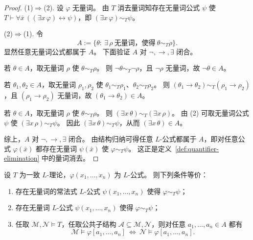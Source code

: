 \documentclass[lang=cn,a4paper,newtx,section]{elegantbook}
\begin{document}
\begin{proof}
(1)$\Rightarrow$(2).
设 $\varphi$ 无量词。
由 $T$ 消去量词知存在无量词公式 $\psi$ 使 $T\vdash\forall\bar x\,((\exists x\,\varphi)\leftrightarrow\psi)$，即 $(\exists x\,\varphi)\sim_T\psi$。

(2)$\Rightarrow$(1).
令
\[
  A:=\{\theta:\ \exists\,\rho\ \text{无量词，使得}\ \theta\sim_T\rho\}.
\]
显然任意无量词公式都属于 $A$。
下面验证 $A$ 对 $\neg,\to,\exists$ 闭合。

若 $\theta\in A$，取无量词 $\rho$ 使 $\theta\sim_T\rho$。
则 $\neg\theta\sim_T\neg\rho$，且 $\neg\rho$ 无量词，故 $\neg\theta\in A$。

若 $\theta_1,\theta_2\in A$，取无量词 $\rho_1,\rho_2$ 使 $\theta_1\sim_T\rho_1$、$\theta_2\sim_T\rho_2$。
则 $(\theta_1\to\theta_2)\sim_T(\rho_1\to\rho_2)$，且 $(\rho_1\to\rho_2)$ 无量词，故 $(\theta_1\to\theta_2)\in A$。

 若 $\theta\in A$，取无量词 $\rho$ 使 $\theta\sim_T\rho$。
 则 $(\exists x\,\theta)\sim_T(\exists x\,\rho)$。
 由 (2) 可取无量词公式 $\psi$ 使 $(\exists x\,\rho)\sim_T\psi$。
 因此 $(\exists x\,\theta)\sim_T\psi$，从而 $(\exists x\,\theta)\in A$。

 综上，$A$ 对 $\neg,\to,\exists$ 闭合。
 由结构归纳可得任意 $L$-公式都属于 $A$，即对任意公式 $\varphi(\bar x)$ 都存在无量词 $\psi(\bar x)$ 使 $\varphi\sim_T\psi$。
 这正是定义~\ref{def:quantifier-elimination} 中的量词消去。
 \end{proof}

\begin{theorem}[常同（常法）公式判别法]
\label{robinson-test-for-formulas}
设 $T$ 为一致 $L$-理论，$\varphi(x_1,\dots,x_n)$ 为 $L$-公式。
则下列条件等价：
\begin{enumerate}
  \item 存在无量词的常法式 $L$-公式 $\psi(x_1,\dots,x_n)$ 使得 $\varphi\sim_T\psi$；
  \item 存在无量词 $L$-公式 $\psi(x_1,\dots,x_n)$ 使得 $\varphi\sim_T\psi$；
  \item 任取 $\mathcal M,\mathcal N\models T$，任取公共子结构 $\mathcal A\subseteq\mathcal M,\mathcal N$，则对任意 $a_1,\dots,a_n\in A$ 都有
  \[
    \mathcal M\models\varphi[a_1,\dots,a_n]\ \Longleftrightarrow\ \mathcal N\models\varphi[a_1,\dots,a_n].
  \]
\end{enumerate}
\end{theorem}
\end{document}
